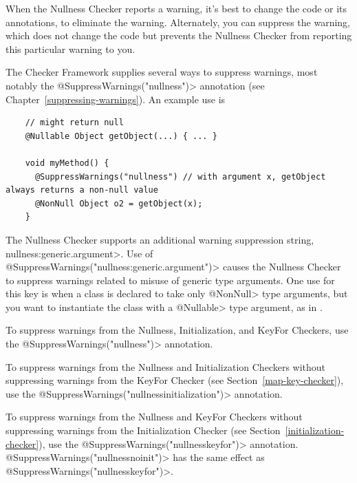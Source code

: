 
When the Nullness Checker reports a warning, it's best to change the code
or its annotations, to eliminate the warning.  Alternately, you can
suppress the warning, which does not change the code but prevents the
Nullness Checker from reporting this particular warning to you.

\begin{sloppypar}
The Checker Framework supplies several ways to suppress warnings, most
notably the \<@SuppressWarnings("nullness")> annotation (see
Chapter~\ref{suppressing-warnings}).  An example use is
\end{sloppypar}

\begin{smaller}
\begin{Verbatim}
    // might return null
    @Nullable Object getObject(...) { ... }

    void myMethod() {
      @SuppressWarnings("nullness") // with argument x, getObject always returns a non-null value
      @NonNull Object o2 = getObject(x);
    }
\end{Verbatim}
\end{smaller}


The Nullness Checker supports an additional warning suppression string,
\<nullness:generic.argument>.
Use of \<@SuppressWarnings("nullness:generic.argument")> causes the Nullness
Checker to suppress warnings related to misuse of generic type
arguments.  One use for this key is when a class is declared to take only
\<@NonNull> type arguments, but you want to instantiate the class with a
\<@Nullable> type argument, as in .

To suppress warnings from the Nullness, Initialization, and KeyFor Checkers,
use the \<@SuppressWarnings("nullness")> annotation.

To suppress warnings from the Nullness and Initialization Checkers without suppressing warnings
from the KeyFor Checker (see Section~\ref{map-key-checker}),
use the \<@SuppressWarnings("nullnessinitialization")> annotation.

To suppress warnings from the Nullness and KeyFor Checkers without suppressing warnings
from the Initialization Checker (see Section~\ref{initialization-checker}),
use the \<@SuppressWarnings("nullnesskeyfor")> annotation.
\<@SuppressWarnings("nullnessnoinit")> has the same effect as \<@SuppressWarnings("nullnesskeyfor")>.

